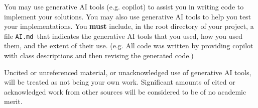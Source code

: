 \documentclass{csse4400}
\begin{document}
You may use generative AI tools (e.g. copilot) to assist you in writing code to implement your solutions. You may also use generative AI tools to help you test your implementations. You \textbf{must} include, in the root directory of your project, a file \texttt{AI.md }that indicates the generative AI tools that you used, how you used them, and the extent of their use. (e.g. All code was written by providing copilot with class descriptions and then revising the generated code.)

Uncited or unreferenced material, or unacknowledged use of generative AI tools, will be treated as not being your own work. Significant amounts of cited or acknowledged work from other sources will be considered to be of no academic merit.





\end{document}
